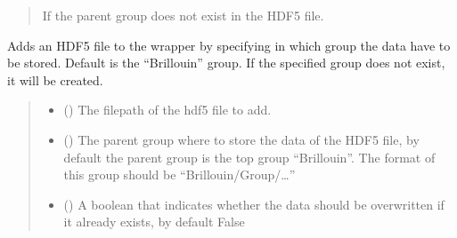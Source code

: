 \documentclass[letterpaper,10pt,english]{sphinxmanual}
\begin{document}
\begin{fulllineitems}
\begin{fulllineitems}
\begin{quote}
\begin{description}
\begin{itemize}
\end{itemize}

\sphinxAtStartPar
{\hyperref[\detokenize{source/HDF5_BLS:HDF5_BLS.WrapperError.WrapperError_StructureError}]{}} \textendash{} If the parent group does not exist in the HDF5 file.

\end{description}\end{quote}

\end{fulllineitems}


\begin{fulllineitems}
\label{\detokenize{source/HDF5_BLS:HDF5_BLS.wrapper.Wrapper.add_hdf5}}
\pysigstartsignatures
\pysiglinewithargsret
{}
{\sphinxparamcomma {}\sphinxparamcomma {}}
{}
\pysigstopsignatures
\sphinxAtStartPar
Adds an HDF5 file to the wrapper by specifying in which group the data have to be stored. Default is the “Brillouin” group. If the specified group does not exist, it will be created.
\begin{quote}\begin{description}
\begin{itemize}
\item {} 
\sphinxAtStartPar
{} () \textendash{} The filepath of the hdf5 file to add.

\item {} 
\sphinxAtStartPar
{} (\sphinxstyleliteralemphasis{\sphinxupquote{, }}) \textendash{} The parent group where to store the data of the HDF5 file, by default the parent group is the top group “Brillouin”. The format of this group should be “Brillouin/Group/…”

\item {} 
\sphinxAtStartPar
{} (\sphinxstyleliteralemphasis{\sphinxupquote{, }}) \textendash{} A boolean that indicates whether the data should be overwritten if it already exists, by default False


\end{itemize}
\end{description}
\end{quote}
\end{fulllineitems}
\end{fulllineitems}
\end{document}

